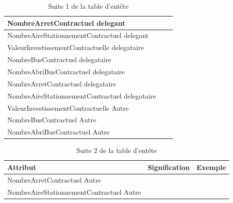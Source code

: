 \documentclass[a4paper]{report}
\begin{document}
\begin{doublespace}
\begin{table}[H]
\begin{center}
\begin{tabularx}{17.5cm}{|X|p{3cm}|p{1.5cm}|}
				\hline
				NombreArretContractuel delegant                &                        &                  \\
				\hline
				NombreAireStationnementContractuel delegant    &                        &                  \\
				\hline
				ValeurInvestissementContractuelle delegataire  &                        &                  \\
				\hline
				NombreBusContractuel delegataire               &                        &                  \\
				\hline
				NombreAbriBusContractuel delegataire           &                        &                  \\
				\hline
				NombreArretContractuel delegataire             &                        &                  \\
				\hline
				NombreAireStationnementContractuel delegataire &                        &                  \\
				\hline
				ValeurInvestissementContractuelle Autre        &                        &                  \\
				\hline
				NombreBusContractuel Autre                     &                        &                  \\
				\hline
				NombreAbriBusContractuel Autre                 &                        &                  \\
				\hline
			\end{tabularx}
			\caption{Suite 1 de la table d'entête}
		\end{center}
	\end{table}
	\begin{table}[H]
		\begin{center}
			\begin{tabularx}{17.5cm}{|X|p{3cm}|p{1.5cm}|}
				\hline
				\textbf{Attribut}                        & \textbf{Signification} & \textbf{Exemple} \\
				\hline
				NombreArretContractuel Autre             &                        &                  \\
				\hline
				NombreAireStationnementContractuel Autre &                        &                  \\
				\hline
			\end{tabularx}
			\caption{Suite 2 de la table d'entête}
		\end{center}
	\end{table}


\end{doublespace}
\end{document}
